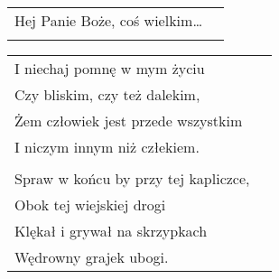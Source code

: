 \documentclass[a5paper]{article}
\begin{document}
\noindent
\begin{tabular}{@{}p{7.50cm}p{3cm}@{}}
Hej Panie Boże, coś wielkim… \\ \\
\end{tabular}

\noindent
\begin{tabular}{@{}p{7.50cm}p{3cm}@{}}
I niechaj pomnę w mym życiu \\
Czy bliskim, czy też dalekim, \\
Żem człowiek jest przede wszystkim \\
I niczym innym niż człekiem. \\ \\

Spraw w końcu by przy tej kapliczce, \\
Obok tej wiejskiej drogi \\
Klękał i grywał na skrzypkach \\
Wędrowny grajek ubogi. 
\end{tabular}
\end{document}
